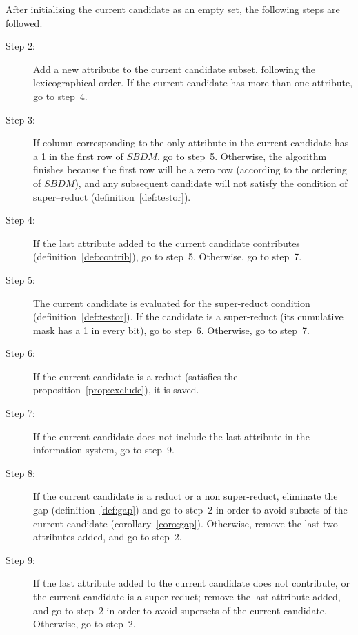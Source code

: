 \documentclass[authoryear,preprint,review,12pt]{elsarticle}
\begin{document}
	After initializing the current candidate as an empty set, the following steps are followed.
	\begin{description}
		\item[Step 2:] Add a new attribute to the current candidate subset, following the lexicographical order. If the current candidate has more than one attribute, go to step~4. 
		\item[Step 3:] If column corresponding to the only attribute in the current candidate has a 1 in the first row of $SBDM$, go to step~5. Otherwise, the algorithm finishes because the first row will be a zero row (according to the ordering of $SBDM$), and any subsequent candidate will not satisfy the condition of super--reduct (definition~\ref{def:testor}).
		\item[Step 4:] If the last attribute added to the current candidate contributes (definition~\ref{def:contrib}), go to step~5. Otherwise, go to step~7.
		\item[Step 5:] The current candidate is evaluated for the super-reduct condition (definition~\ref{def:testor}). If the candidate is a  super-reduct (its cumulative mask has a 1 in every bit), go to step~6. Otherwise, go to step~7.
		\item[Step 6:] If the current candidate is a reduct (satisfies the proposition~\ref{prop:exclude}), it is saved.
		\item[Step 7:] If the current candidate does not include the last attribute in the information system, go to step~9.
		\item[Step 8:] If the current candidate is a reduct or a non super-reduct, eliminate the gap (definition~\ref{def:gap}) and go to step~2 in order to avoid subsets of the current candidate (corollary~\ref{coro:gap}). Otherwise, remove the last two attributes added, and go to step~2.
		\item[Step 9:] If the last attribute added to the current candidate does not contribute, or the current candidate is a super-reduct; remove the last attribute added, and go to step~2 in order to avoid supersets of the current candidate. Otherwise, go to step~2.		
	\end{description}	
	
%	
\end{document}
